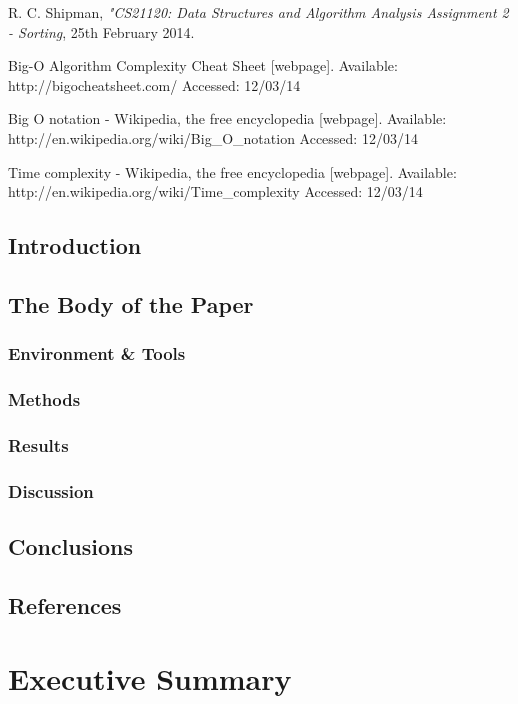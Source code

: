 \documentclass{acm_proc_article-sp}
\begin{document}
\begin{thebibliography}{1}

 R. C. Shipman, {\em "CS21120: Data Structures and Algorithm Analysis Assignment 2 - Sorting}, 25th February 2014.

Big-O Algorithm Complexity Cheat Sheet [webpage]. Available: http://bigocheatsheet.com/ Accessed: 12/03/14

Big O notation - Wikipedia, the free encyclopedia [webpage]. Available: http://en.wikipedia.org/wiki/Big\_O\_notation Accessed: 12/03/14

Time complexity - Wikipedia, the free encyclopedia [webpage]. Available: http://en.wikipedia.org/wiki/Time\_complexity Accessed: 12/03/14

  \end{thebibliography}


\appendix
\subsection{Introduction}
\subsection{The Body of the Paper}
\subsubsection{Environment \& Tools}
\subsubsection{Methods}
\subsubsection{Results}
\subsubsection{Discussion}
\subsection{Conclusions}

\subsection{References}

\section{Executive Summary}
\end{document}
